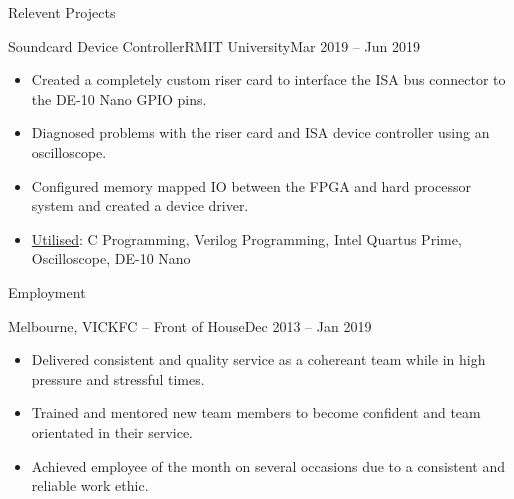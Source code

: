 \documentclass[]{mcdowellcv}
\begin{document}
\begin{cvsection}{Relevent Projects}
\begin{cvsubsection}{Soundcard Device Controller}{RMIT University}{Mar 2019 -- Jun 2019}
\begin{itemize}
				\item Created a completely custom riser card to interface the ISA bus connector to the DE-10 Nano GPIO pins.
				\item Diagnosed problems with the riser card and ISA device controller using an oscilloscope.
				\item Configured memory mapped IO between the FPGA and hard processor system and created a device driver.
				\item \underline{Utilised}: C Programming, Verilog Programming, Intel Quartus Prime, Oscilloscope, DE-10 Nano
			\end{itemize}
		\end{cvsubsection}
\iffalse
-In a pair, designed and developed an ISA device controller for the Sound Blaster 16 sound card for the DE-10 Nano SoC.
-A custom riser card was created to interface the ISA bus connector on the sound card to the DE-10 Nano GPIO pins.
-The controller itself was written in Verilog and deployed on the DE-10 Nano FPGA, this consisted of write, read and configuration registers, as well as logic to match the specific timing requirements of the ISA standard.
-Intel Quartus Prime was utilised to memory map the controller registers to the hard processor system, allowing us to write and read from the card transparently through a basic custom driver.
\fi

\iffalse
		\begin{cvsubsection}{Arduino LED Matrix}{}{}
			\begin{itemize}
				\item Designed and implemented a custom 8x8 LED matrix board with device driver for an Arduino Microcontroller.
				\item \underline{Utilised}: C Programming, Arduino Microcontroller, Circuit Design
			\end{itemize}
		\end{cvsubsection}
\fi

	\end{cvsection}

	\begin{cvsection}{Employment}
		\begin{cvsubsection}{Melbourne, VIC}{KFC -- Front of House}{Dec 2013 -- Jan 2019}
			\begin{itemize}
				\item Delivered consistent and quality service as a cohereant team while in high pressure and stressful times.
				\item Trained and mentored new team members to become confident and team orientated in their service.
				\item Achieved employee of the month on several occasions due to a consistent and reliable work ethic.
			\end{itemize}
		\end{cvsubsection}
	\end{cvsection}
\end{document}
